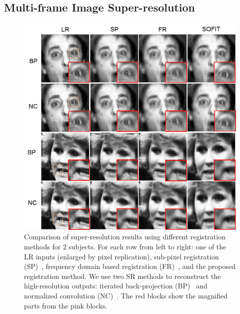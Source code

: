 \documentclass[10pt,journal]{IEEEtran}
\begin{document}
\subsection{Multi-frame Image Super-resolution}

\begin{figure}[t]
	\centering
		\includegraphics[width=\columnwidth]{fig/superResolution.png}
	\caption{Comparison of super-resolution results using different registration methods for 2 subjects. For each row from left to right: one of the LR inputs (enlarged by pixel replication), sub-pixel registration (SP)~\cite{Keren_CVPR88}, frequency domain based registration (FR)~\cite{Vandewalle06}, and the proposed registration method. We use two SR methods to reconstruct the high-resolution outputs: iterated back-projection (BP)~\cite{Irani91} and normalized convolution (NC)~\cite{Pham_06}. The red blocks show the magnified parts from the pink blocks.}
	\label{fig:superResolution}
\end{figure}
\end{document}
